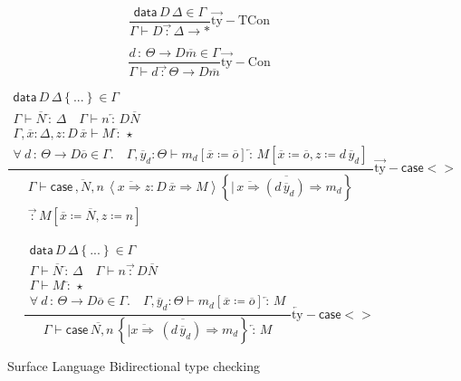 \begin{figure}
\[
\frac{\mathsf{data}\,D\,\Delta\in\Gamma}{\Gamma\vdash D\overrightarrow{\,:\,}\Delta\rightarrow*}\operatorname{\overrightarrow{ty}-TCon}
\]

\[
\frac{d\,:\,\varTheta\rightarrow D\overline{m}\in\Gamma}{\Gamma\vdash d\overrightarrow{\,:\,}\varTheta\rightarrow D\overline{m}}\operatorname{\overrightarrow{ty}-Con}
\]

\[
\frac{\begin{array}{c}
\mathsf{data}\,D\,\Delta\left\{ ...\right\} \in\Gamma\\
\Gamma\vdash\overline{N}\overleftarrow{\,:\,}\Delta\quad\Gamma\vdash n\overleftarrow{\,:\,}D\overline{N}\\
\Gamma,\overline{x}:\Delta,z:D\,\overline{x}\vdash M\overleftarrow{\,:\,}\star\\
\forall\:d\,:\,\varTheta\rightarrow D\overline{o}\in\Gamma.\quad\Gamma,\overline{y}_{d}:\varTheta\vdash m_{d}\left[\overline{x}\coloneqq\overline{o}\right]\overleftarrow{\,:\,}M\left[\overline{x}\coloneqq\overline{o},z\coloneqq d\,\overline{y}_{d}\right]
\end{array}}{\begin{array}{c}
\Gamma\vdash\mathsf{case}\,\overline{,N},n\,\left\langle \overline{x\Rightarrow}z:D\,\overline{x}\Rightarrow M\right\rangle \left\{ \overline{|\,\overline{x\Rightarrow}(d\,\overline{y}_{d})\Rightarrow m_{d}}\right\} \\
\overrightarrow{\,:\,}M\left[\overline{x}\coloneqq\overline{N},z\coloneqq n\right]
\end{array}}\operatorname{\overrightarrow{ty}-}\mathsf{case}<>
\]

\[
\frac{\begin{array}{c}
\mathsf{data}\,D\,\Delta\left\{ ...\right\} \in\Gamma\\
\Gamma\vdash\overline{N}\overleftarrow{\,:\,}\Delta\quad\Gamma\vdash n\overrightarrow{\,:\,}D\overline{N}\\
\Gamma\vdash M\overleftarrow{\,:\,}\star\\
\forall\:d\,:\,\varTheta\rightarrow D\overline{o}\in\Gamma.\quad\Gamma,\overline{y}_{d}:\varTheta\vdash m_{d}\left[\overline{x}\coloneqq\overline{o}\right]\overleftarrow{\,:\,}M
\end{array}}{\Gamma\vdash\mathsf{case}\,\overline{N,}n\,\left\{ \overline{|\overline{x\Rightarrow}\,(d\,\overline{y}_{d})\Rightarrow m_{d}}\right\} \overleftarrow{\,:\,}M}\operatorname{\overleftarrow{ty}-}\mathsf{case}<>
\]


\caption{Surface Language Bidirectional type checking }
\label{fig:surface-data-bi-ty}
\end{figure}

